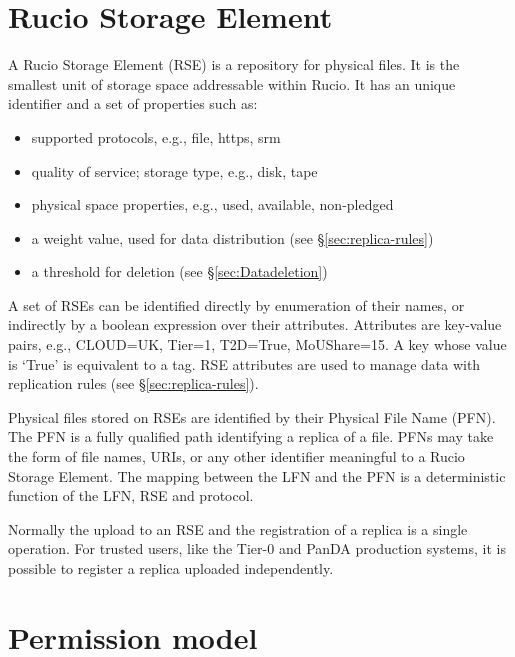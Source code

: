 \documentclass{atlasnote}
\begin{document}
\section{Rucio Storage Element}
\label{overview_Rucio_Storage_Element:rucio-storage-element}\label{overview_Rucio_Storage_Element::doc}

A Rucio Storage Element (RSE) is a repository for physical files. It is the smallest unit of storage space addressable within Rucio. It has an unique identifier and a set of properties such as:

\begin{itemize}
    \item supported protocols, e.g., file, https, srm
    \item quality of service; storage type, e.g., disk, tape
    \item physical space properties, e.g., used, available, non-pledged
    \item a weight value, used for data distribution (see \S\ref{sec:replica-rules})
    \item a threshold for deletion (see \S\ref{sec:Datadeletion})
\end{itemize}

A set of RSEs can be identified directly by enumeration of their names, or indirectly by a boolean expression
 over their attributes. Attributes are key-value pairs, e.g., CLOUD=UK, Tier=1, T2D=True, MoUShare=15. A key whose
 value is ‘True’ is equivalent to a tag. RSE attributes are used to manage data with replication rules (see \S\ref{sec:replica-rules}).

Physical files stored on RSEs are identified by their Physical File Name (PFN). The PFN is a fully qualified path identifying a replica of a file. PFNs may take the form of file names, URIs, or any other identifier meaningful to a Rucio Storage Element. The mapping between the LFN and the PFN is a deterministic function of the LFN, RSE and protocol.

Normally the upload to an RSE and the registration of a replica is a single operation. For trusted users, like the Tier-0 and PanDA production systems, it is possible to register a replica uploaded independently.


\section{Permission model}
\label{overview_Permission_model:permission-model}\label{overview_Permission_model::doc}
\end{document}
